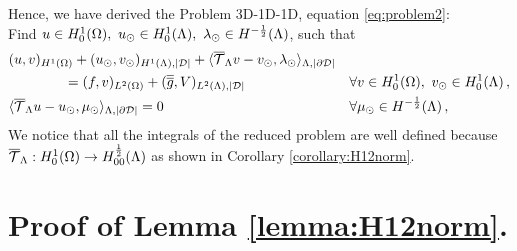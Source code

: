 Hence, we have derived the Problem 3D-1D-1D, equation \eqref{eq:problem2}: \\ 
Find $u \in H^1_0(\Omega),\ u_{\odot} \in H^1_0(\Lambda), \ \lambda_{\odot} \in H^{-\frac 1 2}(\Lambda)$, such that
\begin{subequations}
\begin{align*}
&(u,v)_{H^1(\Omega)} + (u_{\odot},v_{\odot})_{H^1(\Lambda),|\mathcal{D}|} 
+  \langle {\overline{\mathcal{T}}_\Lambda} v - v_{\odot}, \lambda_{\odot} \rangle_{\Lambda, |\partial\mathcal{D}|} &&
\\
\nonumber
&\qquad\qquad= (f,v)_{L^2(\Omega)} +  (\overline{\overline{g}},V)_{L^2(\Lambda),|\mathcal{D}|}
\quad && \forall v \in H^1_0(\Omega), \ v_{\odot} \in H^1_0(\Lambda)\,,
\\
& \langle {\overline{\mathcal{T}}_\Lambda} u -   u_{\odot}, \mu_{\odot} \rangle_{\Lambda,|\partial\mathcal{D}|} = 0
\quad &&\forall \mu_{\odot} \in H^{-\frac 1 2}(\Lambda)\,,
\end{align*}
\end{subequations}
We notice that all the integrals of the reduced problem are well defined because 
${\overline{\mathcal{T}}_\Lambda}: H^1_0(\Omega) \rightarrow H^\frac 1 2_{00}(\Lambda)$ as shown in Corollary \ref{corollary:H12norm}.


\section{Proof of Lemma \ref{lemma:H12norm}.}

